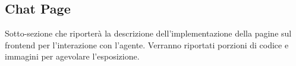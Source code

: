 \subsection{Chat Page}

Sotto-sezione che riporterà la descrizione dell'implementazione della pagine sul frontend per l'interazione con l'agente.
Verranno riportati porzioni di codice e immagini per agevolare l'esposizione.
